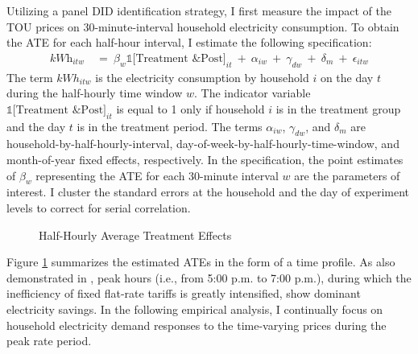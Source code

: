 Utilizing a panel DID identification strategy, I first measure the impact of the TOU prices on 30-minute-interval household electricity consumption. To obtain the ATE for each half-hour interval, I estimate the following specification:
\begin{equation}
\begin{split}
    \textit{kWh}_{itw} \ 
    & = \ \beta_{w} \mathbb{1}\big[ \text{Treatment \& Post} \big]_{it} \ + \ \alpha_{iw} \ + \ \gamma_{dw} \ + \ \delta_{m} \ + \ \epsilon_{itw}
\end{split}
\label{Eq:Model-Specification_Half-Hourly-Average-Treatment-Effects}
\end{equation}
The term $kWh_{itw}$ is the electricity consumption by household $i$ on the day $t$ during the half-hourly time window $w$. The indicator variable $\mathbb{1}\big[ \text{Treatment \& Post} \big]_{it}$ is equal to 1 only if household $i$ is in the treatment group and the day $t$ is in the treatment period. The terms $\alpha_{iw}$, $\gamma_{dw}$, and $\delta_{m}$ are household-by-half-hourly-interval, day-of-week-by-half-hourly-time-window, and month-of-year fixed effects, respectively. In the specification, the point estimates of $\beta_{w}$ representing the ATE for each 30-minute interval $w$ are the parameters of interest. I cluster the standard errors at the household and the day of experiment levels to correct for serial correlation.

\begin{figure}
    \caption{Half-Hourly Average Treatment Effects}
    \label{Figure:Half-Hourly-Average-Treatment-Effects}
\end{figure}
Figure \ref{Figure:Half-Hourly-Average-Treatment-Effects} summarizes the estimated ATEs in the form of a time profile. As also demonstrated in \cite{Peaking-Interest:How-Awareness-Drives-the-Effectiveness-of-Time-of-Use-Electricity-Pricing}, peak hours (i.e., from 5:00 p.m. to 7:00 p.m.), during which the inefficiency of fixed flat-rate tariffs is greatly intensified, show dominant electricity savings. In the following empirical analysis, I continually focus on household electricity demand responses to the time-varying prices during the peak rate period.